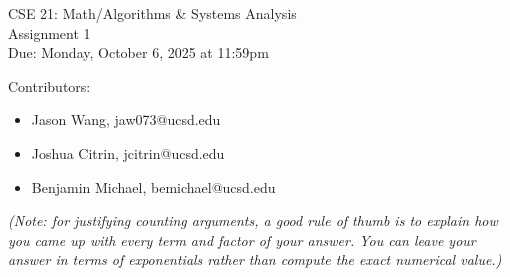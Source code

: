 \documentclass[10pt,letterpaper,unboxed,cm]{article}
\begin{document}
\begin{center}
{\LARGE CSE 21: Math/Algorithms \& Systems Analysis}\\
{\Large Assignment 1}\\
{\large Due: Monday, October 6, 2025 at 11:59pm}
\end{center}


{\large Contributors:}
\begin{itemize}
    \item Jason Wang, jaw073@ucsd.edu
    \item Joshua Citrin, jcitrin@ucsd.edu
    \item Benjamin Michael, bemichael@ucsd.edu
\end{itemize}

\emph{(Note: for justifying counting arguments, a good rule of thumb is to explain how you came up with every term and factor of your answer. You can leave
your answer in terms of exponentials rather than compute the exact numerical value.)}
\end{document}

